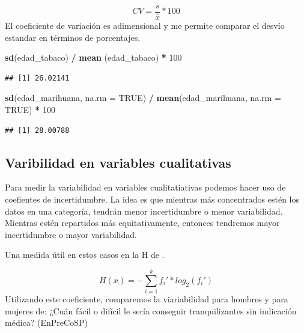 \documentclass[spanish,]{book}
\newenvironment{Shaded}{\begin{snugshade}}{\end{snugshade}}
\newcommand{\KeywordTok}[1]{\textcolor[rgb]{0.13,0.29,0.53}{\textbf{#1}}}
\newcommand{\DataTypeTok}[1]{\textcolor[rgb]{0.13,0.29,0.53}{#1}}
\newcommand{\DecValTok}[1]{\textcolor[rgb]{0.00,0.00,0.81}{#1}}
\newcommand{\StringTok}[1]{\textcolor[rgb]{0.31,0.60,0.02}{#1}}
\newcommand{\OtherTok}[1]{\textcolor[rgb]{0.56,0.35,0.01}{#1}}
\newcommand{\OperatorTok}[1]{\textcolor[rgb]{0.81,0.36,0.00}{\textbf{#1}}}
\newcommand{\NormalTok}[1]{#1}
\begin{document}
\[
CV = \frac{s}{\bar{x}} * 100
\] El coeficiente de variación es adimensional y me permite comparar el
desvío estandar en términos de porcentajes.

\begin{Shaded}
\begin{Highlighting}[]
\KeywordTok{sd}\NormalTok{(edad_tabaco) }\OperatorTok{/}\StringTok{ }\KeywordTok{mean}\NormalTok{ (edad_tabaco) }\OperatorTok{*}\StringTok{ }\DecValTok{100}
\end{Highlighting}
\end{Shaded}

\begin{verbatim}
## [1] 26.02141
\end{verbatim}

\begin{Shaded}
\begin{Highlighting}[]
\KeywordTok{sd}\NormalTok{(edad_marihuana, }\DataTypeTok{na.rm =} \OtherTok{TRUE}\NormalTok{) }\OperatorTok{/}\StringTok{ }\KeywordTok{mean}\NormalTok{(edad_marihuana, }\DataTypeTok{na.rm =} \OtherTok{TRUE}\NormalTok{) }\OperatorTok{*}\StringTok{ }\DecValTok{100}
\end{Highlighting}
\end{Shaded}

\begin{verbatim}
## [1] 28.00788
\end{verbatim}

\subsection{Varibilidad en variables
cualitativas}\label{varibilidad-en-variables-cualitativas}

Para medir la variabilidad en variables cualitatiativas podemos hacer
uso de coefientes de incertidumbre. La idea es que mientras más
concentrados estén los datos en una categoría, tendrán menor
incertidumbre o menor variabilidad. Mientras estén repartidos más
equitativamente, entonces tendremos mayor incertidumbre o mayor
variabilidad.

Una medida útil en estos casos en la H de
\citet{shanon1949mathematical}.

\[
H(x) = -\sum_{i = 1}^k f_i' * log_2 (f_i')
\] Utilizando este coeficiente, comparemos la viariabilidad para hombres
y para mujeres de: ¿Cuán fácil o difícil le sería conseguir
tranquilizantes sin indicación médica? (EnPreCoSP)
\end{document}
